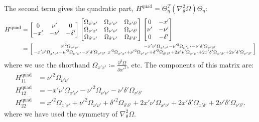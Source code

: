 \documentclass{article}
\begin{document}
%
The second term gives the quadratic part, $H^{\text{quad}} = \Theta_\eta^T (\nabla_\theta^2 \Omega) \Theta_\eta$:
%
\begin{align}
  H^{\text{quad}} & =
  \begin{bmatrix}
    0   & \nu'  & 0        \\
    -x' & -\nu' & -\delta'
  \end{bmatrix}
  \begin{bmatrix}
    \Omega_{x'x'}      & \Omega_{x'\nu'}      & \Omega_{x'\delta'}      \\
    \Omega_{\nu'x'}    & \Omega_{\nu'\nu'}    & \Omega_{\nu'\delta'}    \\
    \Omega_{\delta'x'} & \Omega_{\delta'\nu'} & \Omega_{\delta'\delta'}
  \end{bmatrix}
  \begin{bmatrix}
    0    & -x'      \\
    \nu' & -\nu'    \\
    0    & -\delta'
  \end{bmatrix}                     \\
                  & = \begin{bsmallmatrix}
    \nu'^2 \Omega_{\nu'\nu'} & -x'\nu'\Omega_{x'\nu'} - \nu'^2\Omega_{\nu'\nu'} - \nu'\delta'\Omega_{\nu'\delta'} \\
    -x'\nu'\Omega_{x'\nu'} - \nu'^2\Omega_{\nu'\nu'} - \nu'\delta'\Omega_{\nu'\delta'} & x'^2\Omega_{x'x'} + \nu'^2\Omega_{\nu'\nu'} + \delta'^2\Omega_{\delta'\delta'} + 2x'\nu'\Omega_{x'\nu'} + 2x'\delta'\Omega_{x'\delta'} + 2\nu'\delta'\Omega_{\nu'\delta'}
  \end{bsmallmatrix}
\end{align}
%
where we use the shorthand $\Omega_{x'x'} \coloneqq \frac{\partial^2 \Omega}{\partial x'^2}$, etc.
The components of this matrix are:
%
\begin{align}
  H^{\text{quad}}_{11} & = \nu'^2 \Omega_{\nu'\nu'}                                                                                                                                                   \\
  H^{\text{quad}}_{12} & = -x'\nu'\Omega_{x'\nu'} - \nu'^2\Omega_{\nu'\nu'} - \nu'\delta'\Omega_{\nu'\delta'}                                                                                         \\
  H^{\text{quad}}_{22} & = x'^2\Omega_{x'x'} + \nu'^2\Omega_{\nu'\nu'} + \delta'^2\Omega_{\delta'\delta'} + 2x'\nu'\Omega_{x'\nu'} + 2x'\delta'\Omega_{x'\delta'} + 2\nu'\delta'\Omega_{\nu'\delta'}.
\end{align}
%
where we have used the symmetry of $\nabla_\theta^2 \Omega$.
\end{document}
